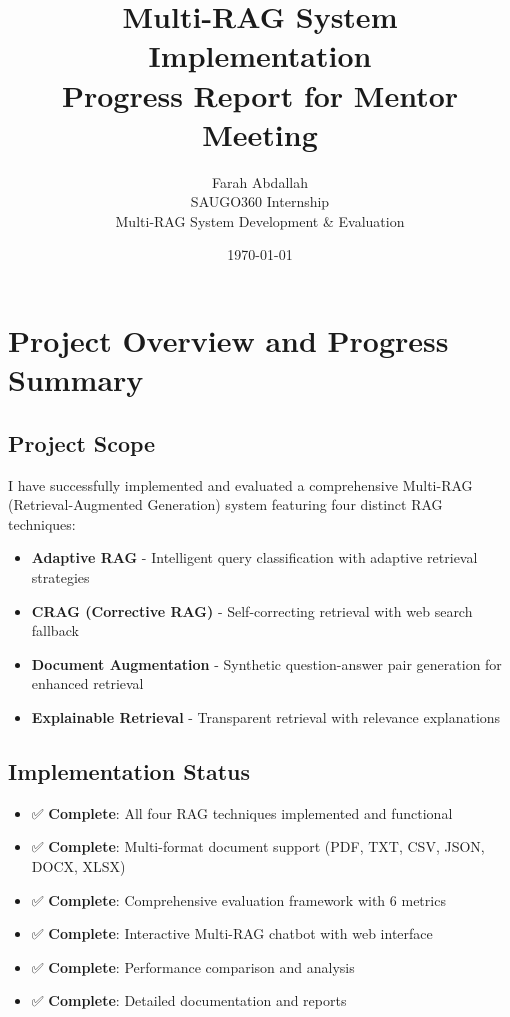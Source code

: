 \documentclass[12pt,a4paper]{article}
\title{\textbf{Multi-RAG System Implementation \\
Progress Report for Mentor Meeting}}
\author{Farah Abdallah\\
SAUGO360 Internship\\
Multi-RAG System Development \& Evaluation}
\date{\today}
\begin{document}
\maketitle

\tableofcontents
\newpage

\section{Project Overview and Progress Summary}

\subsection{Project Scope}
I have successfully implemented and evaluated a comprehensive Multi-RAG (Retrieval-Augmented Generation) system featuring four distinct RAG techniques:
\begin{itemize}
    \item \textbf{Adaptive RAG} - Intelligent query classification with adaptive retrieval strategies
    \item \textbf{CRAG (Corrective RAG)} - Self-correcting retrieval with web search fallback
    \item \textbf{Document Augmentation} - Synthetic question-answer pair generation for enhanced retrieval
    \item \textbf{Explainable Retrieval} - Transparent retrieval with relevance explanations
\end{itemize}

\subsection{Implementation Status}
\begin{itemize}
    \item ✅ \textbf{Complete}: All four RAG techniques implemented and functional
    \item ✅ \textbf{Complete}: Multi-format document support (PDF, TXT, CSV, JSON, DOCX, XLSX)
    \item ✅ \textbf{Complete}: Comprehensive evaluation framework with 6 metrics
    \item ✅ \textbf{Complete}: Interactive Multi-RAG chatbot with web interface
    \item ✅ \textbf{Complete}: Performance comparison and analysis
    \item ✅ \textbf{Complete}: Detailed documentation and reports
\end{itemize}
\end{document}
